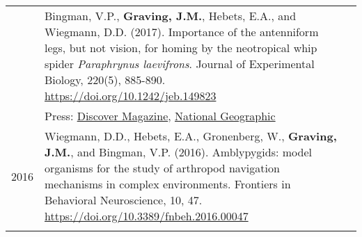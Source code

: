 \documentclass[letterpaper,6pt,oneside]{article}
\begin{document}
\begin{small}
\begin{longtable}{@{} l p{5.3in}l}
& Bingman, V.P., \textbf{Graving, J.M.}, Hebets, E.A., and Wiegmann, D.D. (2017). Importance of the antenniform legs, but not vision, for homing by the neotropical whip spider \textit{Paraphrynus laevifrons}. Journal of Experimental Biology, 220(5), 885-890.  \href{https://doi.org/10.1242/jeb.149823}{https://doi.org/10.1242/jeb.149823}\\
&Press: \href{http://blogs.discovermagazine.com/inkfish/2017/01/24/whip-spiders-use-their-feet-to-smell-their-way-home}{Discover Magazine}, 
\href{https://www.youtube.com/watch?v=eUoFegXxmfo}{National Geographic} \vspace{1mm} \\

\large{2016}
& Wiegmann, D.D., Hebets, E.A., Gronenberg, W., \textbf{Graving, J.M.}, and Bingman, V.P. (2016). Amblypygids: model organisms for the study of arthropod navigation mechanisms in complex environments. Frontiers in Behavioral Neuroscience, 10, 47. \href{https://doi.org/10.3389/fnbeh.2016.00047}{https://doi.org/10.3389/fnbeh.2016.00047} \vspace{1mm} \\   

 & \\ 


 

\end{longtable}
\end{small}
\end{document}
